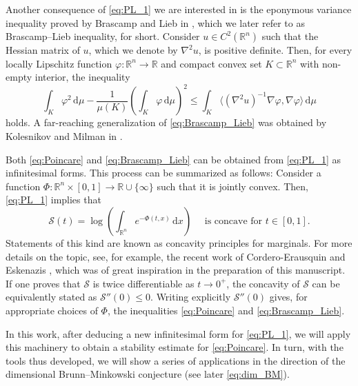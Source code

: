 \documentclass[a4paper, 11pt]{article}
\newcommand{\R}{\mathbb{R}}
\theoremstyle{definition}
\newcommand{\di}{\, \mathrm{d}}
\newcommand{\F}{\mathcal{S}}
\begin{document}
Another consequence of \eqref{eq:PL_1} we are interested in is the eponymous variance inequality proved by Brascamp and Lieb in \cite{Brascamp_Lieb_76}, which we later refer to as Brascamp--Lieb inequality, for short. Consider $u \in C^2(\R^n)$ such that the Hessian matrix of $u$, which we denote by $\nabla^2 u$, is positive definite. Then, for every locally Lipschitz function $\varphi: \R^n \to \R$ and compact convex set $K \subset \R^n$ with non-empty interior, the inequality 
\begin{equation}\label{eq:Brascamp_Lieb}
    \int_K \varphi^2 \di \mu - \frac{1}{\mu(K)}\left( \int_K \varphi \di \mu\right)^2 \leq \int_K \langle (\nabla^2 u)^{-1} \nabla \varphi, \nabla \varphi\rangle \di \mu
\end{equation}
holds. A far-reaching generalization of \eqref{eq:Brascamp_Lieb} was obtained by Kolesnikov and Milman in \cite{Kol_Mil_BL}. 

\medskip

Both \eqref{eq:Poincare} and \eqref{eq:Brascamp_Lieb} can be obtained from \eqref{eq:PL_1} as infinitesimal forms. This process can be summarized as follows: Consider a function $\Phi: \R^n \times [0,1] \to \R \cup \{ \infty\}$ such that it is jointly convex. Then, \eqref{eq:PL_1} implies that  \[ \F(t)=\log \left(\int_{\R^n} e^{-\Phi(t,x)} \di x \right) \quad \text{ is concave for } t \in [0,1]. \] Statements of this kind are known as concavity principles for marginals. For more details on the topic, see, for example, the recent work of Cordero-Erausquin and Eskenazis \cite{cordero2025concavity}, which was of great inspiration in the preparation of this manuscript. If one proves that $\F$ is twice differentiable as $t \to 0^+$, the concavity of $\F$ can be equivalently stated as $\F''(0)\leq 0$. Writing explicitly $\F''(0)$ gives, for appropriate choices of $\Phi$, the inequalities \eqref{eq:Poincare} and \eqref{eq:Brascamp_Lieb}.

\medskip

In this work, after deducing a new infinitesimal form for \eqref{eq:PL_1}, we will apply this machinery to obtain a stability estimate for \eqref{eq:Poincare}. In turn, with the tools thus developed, we will show a series of applications in the direction of the dimensional Brunn--Minkowski conjecture (see later \eqref{eq:dim_BM}). 
\end{document}
